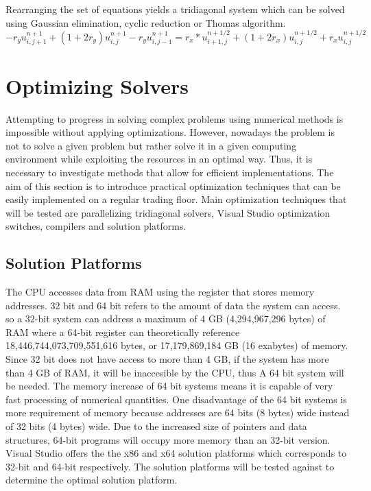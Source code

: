 \documentclass[12pt, oneside]{book}
\theoremstyle{plain}
\theoremstyle{definition}
\begin{document}
Rearranging the set of equations yields a tridiagonal system which can be solved using Gaussian elimination, cyclic reduction or Thomas algorithm.
\begin{equation}
-r_y u^{n+1}_{i,j+1} + (1 + 2r_y) u^{n+1}_{i,j} - r_y u^{n+1}_{i,j-1} = r_x * u^{n+1/2}_{i+1,j} + (1 + 2r_x) u^{n+1/2}_{i,j} + r_x u^{n+1/2}_{i,j}
\end{equation}

\chapter{Optimizing Solvers}

Attempting to progress in solving complex problems using numerical methods is impossible without applying optimizations. However, nowadays the problem is not to solve a given problem but rather solve it in a given computing environment while exploiting the resources in an optimal way. Thus, it is necessary to investigate methods that allow for efficient implementations. The aim of this section is to introduce practical optimization techniques that can be easily implemented on a regular trading floor. Main optimization techniques that will be tested are parallelizing tridiagonal solvers, Visual Studio optimization switches, compilers and solution platforms.

\section{Solution Platforms}
The CPU accesses data from RAM using the register that stores memory addresses. 32 bit and 64 bit refers to the amount of data the system can access. so a 32-bit system can address a maximum of 4 GB (4,294,967,296 bytes) of RAM where a 64-bit register can theoretically reference 18,446,744,073,709,551,616 bytes, or 17,179,869,184 GB (16 exabytes) of memory. Since 32 bit does not have access to more than 4 GB, if the system has more than 4 GB of RAM, it will be inaccesible by the CPU, thus A 64 bit system will be needed. The memory increase of 64 bit systems means it is capable of very fast processing of numerical quantities. One disadvantage of the 64 bit systems is more requirement of memory because addresses are 64 bits (8 bytes) wide instead of 32 bits (4 bytes) wide. Due to the increased size of pointers and data structures, 64-bit programs will occupy more memory than an 32-bit version. Visual Studio offers the the x86 and x64 solution platforms which corresponds to 32-bit and 64-bit respectively. The solution platforms will be tested against to determine the optimal solution platform.
\end{document}
